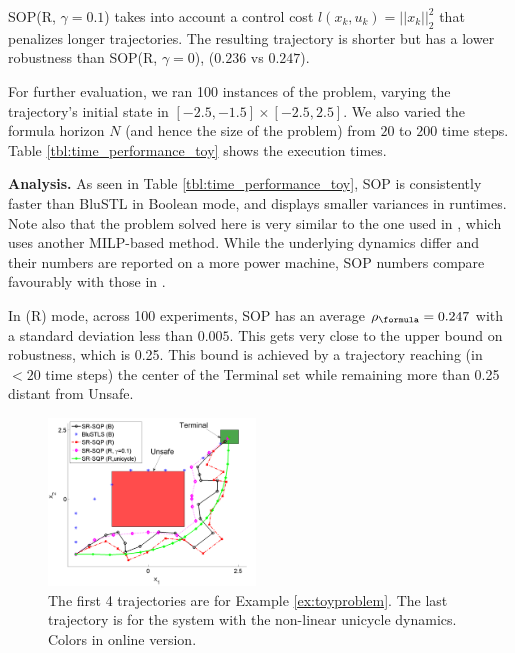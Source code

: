 \begin{exmp}
SOP(R, $\gamma\!=\!0.1$) takes into account a control cost $l(x_k,u_k) = ||x_k||_{2}^2$ that penalizes longer trajectories.
The resulting trajectory is shorter but has a lower robustness than SOP(R, $\gamma = 0$), ($0.236$ vs $0.247$).

For further evaluation, we ran 100 instances of the problem, varying the trajectory's initial state in $[-2.5,-1.5] \times [-2.5,2.5]$. 
We also varied the formula horizon $N$ (and hence the size of the problem) from $20$ to $200$ time steps. 
Table \ref{tbl:time_performance_toy} shows the execution times. 


\textbf{Analysis.}
As seen in Table \ref{tbl:time_performance_toy}, SOP is consistently faster than BluSTL in Boolean mode, and displays smaller variances in runtimes. 
Note also that the problem solved here is very similar to the one used in \cite{Saha_acc16}, which uses another MILP-based method. 
While the underlying dynamics differ and their numbers are reported on a more power machine, 
SOP numbers compare favourably with those in \cite{Saha_acc16}.

In (R) mode, across 100 experiments, SOP has an average $\rob_{\formula}=0.247$ with a standard deviation less than $0.005$. 
This gets very close to the upper bound on robustness, which is 0.25.
This bound is achieved by a trajectory reaching (in $<20$ time steps) the center of the Terminal set while remaining more than 0.25 distant from Unsafe. 
\end{exmp}

\begin{figure}[t]
\centering
\includegraphics[width=0.49\textwidth]{figures/ToyExUni_alternate_scissored.pdf}
\vspace{-20pt}
\caption{{\small The first 4 trajectories are for Example \ref{ex:toyproblem}. The last trajectory is for the system with the non-linear unicycle dynamics. Colors in online version.}}
\label{fig:toy control}
\vspace{-10pt}
\end{figure}



